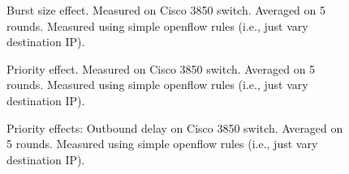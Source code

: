 \fi




\iffalse
\begin{figure}
\centering
{}
\caption{Burst size effect. Measured on Cisco 3850 switch. Averaged on 5 rounds. Measured using simple openflow rules (i.e., just vary destination IP).}\label{bcm_compare_priority_simple2}
\end{figure}

\begin{figure}
\centering
{}
\caption{Priority effect. Measured on Cisco 3850 switch. Averaged on 5 rounds. Measured using simple openflow rules (i.e., just vary destination IP).}\label{bcm_compare_priority_simple2}
\end{figure}

\begin{figure}
\hfill
{}
\caption{Priority effects: Outbound delay on Cisco 3850 switch. Averaged on 5 rounds. Measured using simple openflow rules (i.e., just vary destination IP).}
\end{figure}


